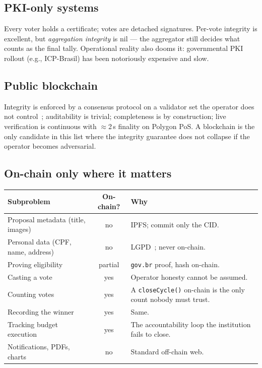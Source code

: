 \documentclass[12pt]{article}
\begin{document}
\subsection{PKI-only systems}

Every voter holds a certificate; votes are detached signatures. Per-vote
integrity is excellent, but \textit{aggregation integrity} is nil --- the
aggregator still decides what counts as the final tally. Operational reality
also dooms it: governmental PKI rollout (e.g., ICP-Brasil) has been
notoriously expensive and slow.

\subsection{Public blockchain}

Integrity is enforced by a consensus protocol on a validator set the
operator does not control~\cite{wood2014yellowpaper}; auditability is
trivial; completeness is by construction; live verification is continuous
with \(\approx\)2\,s finality on Polygon PoS. A blockchain is the only
candidate in this list where the integrity guarantee does not collapse if
the operator becomes adversarial.

\subsection{On-chain only where it matters}
\label{sec:on-chain-only}

\noindent\begin{tabular}{p{} c p{}}
\toprule
\textbf{Subproblem} & \textbf{On-chain?} & \textbf{Why} \\
\midrule
Proposal metadata (title, images) & no & IPFS; commit only the CID. \\
Personal data (CPF, name, address) & no & LGPD~\cite{lgpd}; never on-chain. \\
Proving eligibility & partial & \texttt{gov.br} proof, hash on-chain. \\
Casting a vote & yes & Operator honesty cannot be assumed. \\
Counting votes & yes & A \texttt{closeCycle()} on-chain is the only count nobody must trust. \\
Recording the winner & yes & Same. \\
Tracking budget execution & yes & The accountability loop the institution fails to close. \\
Notifications, PDFs, charts & no & Standard off-chain web. \\
\bottomrule
\end{tabular}
\end{document}
